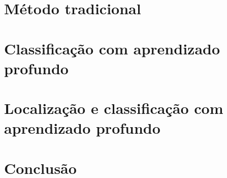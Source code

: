 \documentclass[a5paper]{ufsc-thesis}  %
\begin{document}
\pretextual%
\imprimircapa%
\imprimirfolhaderosto*%
\clearpage
\imprimirfichacatalografica%
\textual%



\chapter{Método tradicional}
\chapter{Classificação com aprendizado profundo}
\chapter{Localização e classificação com aprendizado profundo}
\chapter{Conclusão}
\end{document}
